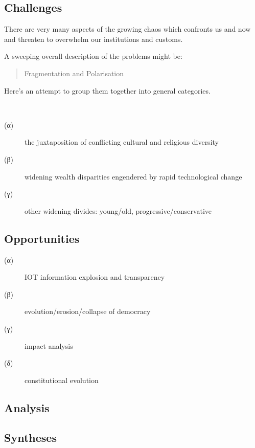 \documentclass[14pt,titlepage]{extarticle}
\begin{document}
  
\subsection{Challenges}

There are very many aspects of the growing chaos which confronts us and now and threaten to overwhelm our institutions and customs.

A sweeping overall description of the problems might be:

\begin{quote}
Fragmentation and Polarisation
\end{quote}

Here's an attempt to group them together into general categories.

\

\hfill\begin{minipage}{\dimexpr\textwidth-1cm}
\begin{description}
\item[(α)] the juxtaposition of conflicting cultural and religious diversity
\item[(β)] widening wealth disparities engendered by rapid technological change
\item[(γ)] other widening divides: young/old, progressive/conservative
\end{description}
\end{minipage}

\subsection{Opportunities}

\hfill\begin{minipage}{\dimexpr\textwidth-1cm}
\begin{description}
\item[(α)] IOT information explosion and transparency
\item[(β)] evolution/erosion/collapse of democracy
\item[(γ)] impact analysis
\item[(δ)] constitutional evolution
\end{description}
\end{minipage}

\subsection{Analysis}

\subsection{Syntheses}
\end{document}
